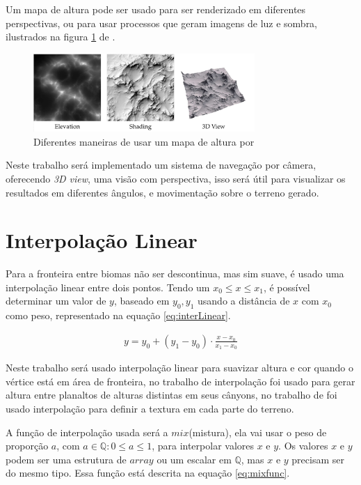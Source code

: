 Um mapa de altura pode ser usado para ser renderizado em diferentes perspectivas,
ou para usar processos que geram imagens de luz e sombra, ilustrados na figura \ref{fig:hmap} de \cite{dachsbacher2006interactive}.
\begin{figure}[H]
    \centering
    \includegraphics[width=0.75\textwidth]{figuras/hmap.png}
    \caption{Diferentes maneiras de usar um mapa de altura por \cite{dachsbacher2006interactive}}
    \label{fig:hmap}
\end{figure}

Neste trabalho será implementado um sistema de navegação por câmera, oferecendo \textit{3D view}, 
uma visão com perspectiva, isso será útil para visualizar os resultados em diferentes
ângulos, e movimentação sobre o terreno gerado.

\section{Interpolação Linear}

Para a fronteira entre biomas não ser descontinua, mas sim suave, é usado uma interpolação linear entre dois pontos.
Tendo um $x_{0} \leq x \leq x_{1}$, é possível determinar um valor de $y$, baseado em $y_{0}, y_{1}$ usando a distância
de $x$ com $x_{0}$ como peso, representado na equação \ref{eq:interLinear}.

\begin{equation}\label{eq:interLinear}
  \begin{split}
    y = y_{0} + (y_{1} - y_{0}) \cdot \frac{x - x_{0}}{x_{1} - x_{0}}
  \end{split}
\end{equation}

Neste trabalho será usado interpolação linear para suavizar altura e cor quando
o vértice está em área de fronteira, no trabalho de \cite{carli2012canion} interpolação 
foi usado para gerar altura entre planaltos de alturas distintas em seus cânyons, no 
trabalho de \cite{fernando2009costas} foi usado interpolação para definir a textura 
em cada parte do terreno.

A função de interpolação usada será a $mix$(mistura), ela vai usar o peso de proporção $a$, 
com $a \in \mathbb{Q}: 0 \leq a \leq 1$, para interpolar valores $x$ e $y$. Os valores $x$ e $y$
podem ser uma estrutura de $array$ ou um escalar em $\mathbb{Q}$, mas $x$ e $y$ precisam ser do mesmo tipo.
Essa função está descrita na equação \ref{eq:mixfunc}.

